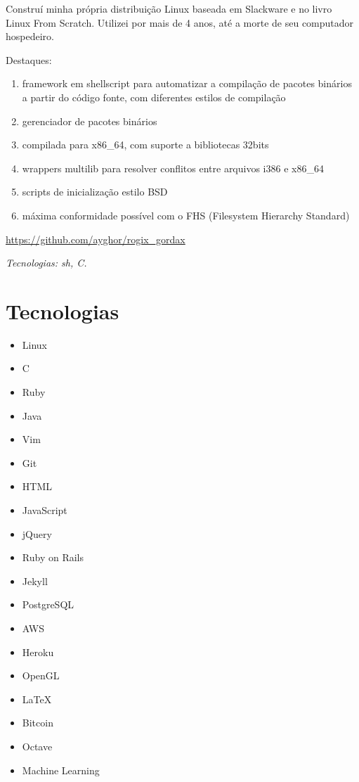 \documentclass[a4paper]{simplecv}
\begin{document}
\begin{topic}
	Construí minha própria distribuição Linux baseada em Slackware e no
	livro Linux From Scratch. Utilizei por mais de 4 anos, até a morte de
	seu computador hospedeiro.

	Destaques:

	\begin{enumerate}
		\item framework em shellscript para automatizar a compilação de
			pacotes binários a partir do código fonte, com
			diferentes estilos de compilação

		\item gerenciador de pacotes binários

		\item compilada para x86\_64, com suporte a bibliotecas 32bits

		\item wrappers multilib para resolver conflitos entre arquivos
			i386 e x86\_64

		\item scripts de inicialização estilo BSD

		\item máxima conformidade possível com o FHS (Filesystem
			Hierarchy Standard)
	\end{enumerate}

	{\scriptsize\url{https://github.com/ayghor/rogix\_gordax}}

	{\em\scriptsize Tecnologias: sh, C.}

\end{topic}

\section{Tecnologias}

\begin{multicols}{3}
	\raggedcolumns
	\begin{itemize}
		\item Linux
		\item C
		\item Ruby
		\item Java
		\item Vim
		\item Git
		\item HTML
		\item JavaScript
		\item jQuery
		\item Ruby on Rails
		\item Jekyll
		\item PostgreSQL
		\item AWS
		\item Heroku
		\item OpenGL
		\item \LaTeX{}
		\item Bitcoin
		\item Octave
		\item Machine Learning
	\end{itemize}
\end{multicols}
\end{document}
